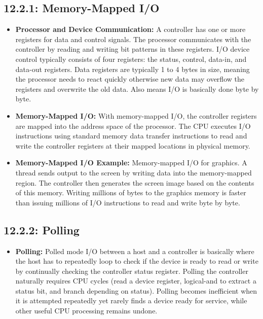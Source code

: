\documentclass[12pt]{article}
\begin{document}
\subsection*{12.2.1: Memory-Mapped I/O}

\begin{itemize}
    \item \textbf{Processor and Device Communication:} A controller has one or more registers for data and control signals. The processor communicates with the controller by reading and writing bit patterns in these registers. I/O device control typically consists of four registers: the status, control, data-in, and data-out registers. Data registers are typically 1 to 4 bytes in size, meaning the processor needs to react quickly otherwise new data may overflow the registers and overwrite the old data. Also means I/O is basically done byte by byte.
    \item \textbf{Memory-Mapped I/O:} With memory-mapped I/O, the controller registers are mapped into the address space of the processor. The CPU executes I/O instructions using standard memory data transfer instructions to read and write the controller registers at their mapped locations in physical memory.
    \item \textbf{Memory-Mapped I/O Example:} Memory-mapped I/O for graphics. A thread sends output to the screen by writing data into the memory-mapped region. The controller then generates the screen image based on the contents of this memory. Writing millions of bytes to the graphics memory is faster than issuing millions of I/O instructions to read and write byte by byte.
\end{itemize}

\subsection*{12.2.2: Polling}

\begin{itemize}
    \item \textbf{Polling:} Polled mode I/O between a host and a controller is basically where the host has to repeatedly loop to check if the device is ready to read or write by continually checking the controller status register. Polling the controller naturally requires CPU cycles (read a device register, logical-and to extract a status bit, and branch depending on status). Polling becomes inefficient when it is attempted repeatedly yet rarely finds a device ready for service, while other useful CPU processing remains undone.
\end{itemize}
\end{document}
